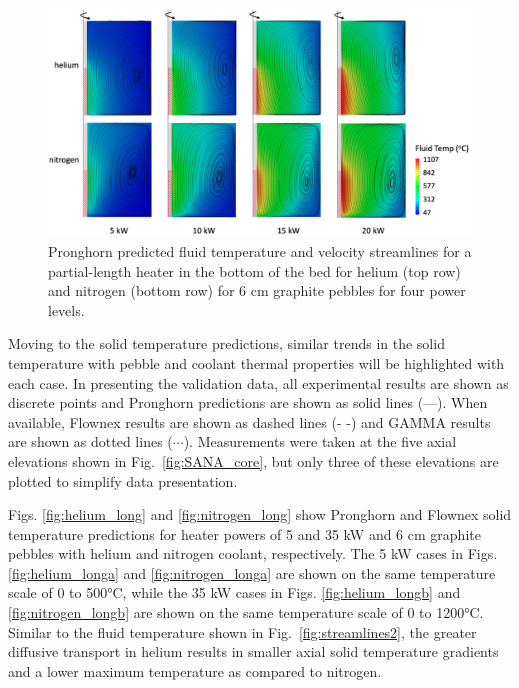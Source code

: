 \begin{figure}[h!]
\centering
\centerline{
\includegraphics[height=0.6\linewidth]{figs/sana_bottom_vel.png}}
\caption{Pronghorn predicted fluid temperature and velocity streamlines for a partial-length heater in the bottom of the bed for helium (top row) and nitrogen (bottom row) for 6 \si{\centi\meter} graphite pebbles for four power levels.}
\label{fig:streamlines1}
\end{figure}

Moving to the solid temperature predictions, similar trends in the solid temperature with pebble and coolant thermal properties will be highlighted with each case. In presenting the validation data, all experimental results are shown as discrete points and Pronghorn predictions are shown as solid lines (---). When available, Flownex results are shown as dashed lines (- -) and GAMMA results are shown as dotted lines ($\cdots$). Measurements were taken at the five axial elevations shown in Fig.\ \ref{fig:SANA_core}, but only three of these elevations are plotted to simplify data presentation.

Figs. \ref{fig:helium_long} and \ref{fig:nitrogen_long} show Pronghorn and Flownex solid temperature predictions for heater powers of 5 and 35 \si{\kilo\watt} and 6 \si{\centi\meter} graphite pebbles with helium and nitrogen coolant, respectively. The 5 \si{\kilo\watt} cases in Figs. \ref{fig:helium_longa} and \ref{fig:nitrogen_longa} are shown on the same temperature scale of 0 to 500\si{\celsius}, while the 35 \si{\kilo\watt} cases in Figs. \ref{fig:helium_longb} and \ref{fig:nitrogen_longb} are shown on the same temperature scale of 0 to 1200\si{\celsius}. Similar to the fluid temperature shown in Fig.\ \ref{fig:streamlines2}, the greater diffusive transport in helium results in smaller axial solid temperature gradients and a lower maximum temperature as compared to nitrogen. 

